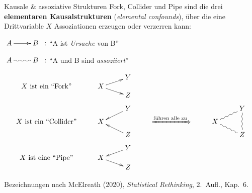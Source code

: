 \documentclass[
  10pt,
  ignorenonframetext,
]{beamer}
\begin{document}
\begin{frame}{Kausale \& assoziative Strukturen}
\protect\hypertarget{kausale-assoziative-strukturen-2}{}
Fork, Collider und Pipe sind die drei \textbf{elementaren
Kausalstrukturen} (\emph{elemental confounds}), über die eine
Drittvariable \(X\) Assoziationen erzeugen oder verzerren kann:

\begin{small}
$\xymatrix{A \ar[r] & B} \;:$ ``A ist \textit{Ursache} von B''

$\xymatrix{A \ar@{~}[r] & B} \;:$ ``A und B sind \textit{assoziiert}''

\begin{displaymath}
    \xymatrix@R-2pc{
      &                   & Y &  & &\\
  \text{$X$ ist ein ``Fork''} &  X \ar[dr]\ar[ur] &   &  & &\\
      &                   & Z &  & &\\
      &                   &   &  & &\\
      &                   & Y \ar[dl] & & & Y\ar@{~}[dd]\\
   \text{$X$ ist ein ``Collider''}    &  X  &  & \xRightarrow{\text{führen alle zu}}  & X \ar@{~}[dr]\ar@{~}[ur] &\\
      &                   & Z \ar[ul] & & & Z\\
      &                   &   & & &\\
      &                   & Y \ar[dl] & & &\\
   \text{$X$ ist eine ``Pipe''}   &  X \ar[dr]  &   & & &\\
      &                   & Z  & & &
}
\end{displaymath}
\end{small}

\vspace{0pt plus 1filll}

\tiny Bezeichnungen nach McElreath (2020), \emph{Statistical
Rethinking}, 2.~Aufl., Kap.~6.
\end{frame}
\end{document}
